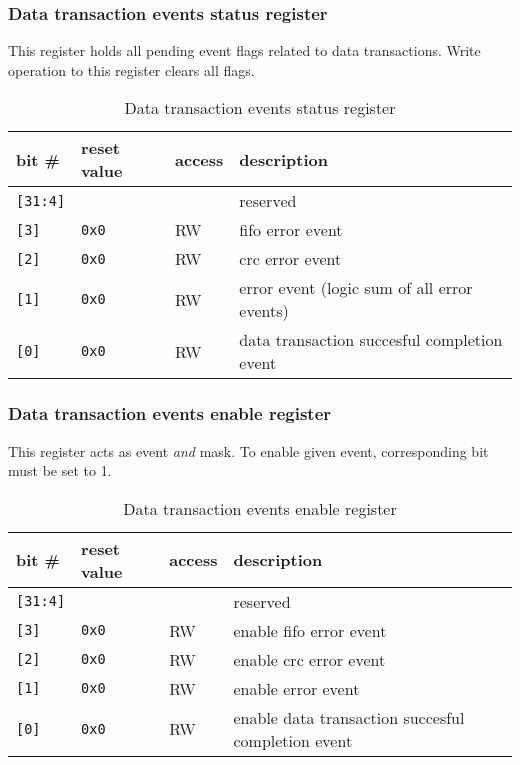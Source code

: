     \subsubsection{Data transaction events status register}
    \label{sec:data_evt_reg}
    
    This register holds all pending event flags related to data transactions. Write operation to this register
    clears all flags.
    
    \begin{table}[H]
    \caption{Data transaction events status register}
        \begin{tabular}{m{1.3cm}|m{2cm}|m{1cm}|m{8cm}}
                \rowcolor[gray]{0.7} bit \# & reset value & access & description \\ \hline \hline
                \texttt{[31:4]} & & & reserved \\ \hline
                \texttt{[3]} & \texttt{0x0} & RW & fifo error event \\ \hline
                \texttt{[2]} & \texttt{0x0} & RW & crc error event \\ \hline
                \texttt{[1]} & \texttt{0x0} & RW & error event (logic sum of all error events) \\ \hline
                \texttt{[0]} & \texttt{0x0} & RW & data transaction succesful completion event \\ \hline
                \hline
        \end{tabular}
        \label{tab:data_evt_reg}
    \end{table}
    
    \subsubsection{Data transaction events enable register}
    \label{sec:data_ena_reg}
    
    This register acts as event \textit{and} mask. To enable given event, corresponding bit must be set to 1.
    
    \begin{table}[H]
    \caption{Data transaction events enable register}
        \begin{tabular}{m{1.3cm}|m{2cm}|m{1cm}|m{8cm}}
                \rowcolor[gray]{0.7} bit \# & reset value & access & description \\ \hline \hline
                \texttt{[31:4]} & & & reserved \\ \hline
                \texttt{[3]} & \texttt{0x0} & RW & enable fifo error event \\ \hline
                \texttt{[2]} & \texttt{0x0} & RW & enable crc error event \\ \hline
                \texttt{[1]} & \texttt{0x0} & RW & enable error event \\ \hline
                \texttt{[0]} & \texttt{0x0} & RW & enable data transaction succesful completion event \\ \hline
                \hline
        \end{tabular}
        \label{tab:data_ena_reg}
    \end{table}
    
